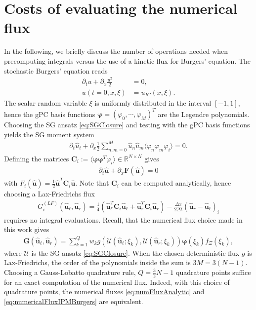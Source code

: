 \appendix
\section{Costs of evaluating the numerical flux}
\label{app:costNumFlux}
In the following, we briefly discuss the number of operations needed when precomputing integrals versus the use of a kinetic flux for Burgers' equation. The stochastic Burgers' equation reads
\begin{align*}
\partial_t u + \partial_x \frac{u^2}{2} &= 0,\\
u(t=0,x,\xi) &= u_{IC}(x,\xi).
\end{align*}
The scalar random variable $\xi$ is uniformly distributed in the interval $[-1,1]$, hence the gPC basis functions $\bm\varphi=(\varphi_0,\cdots,\varphi_M)^T$ are the Legendre polynomials. Choosing the SG ansatz \eqref{eq:SGClosure} and testing with the gPC basis functions yields the SG moment system
\begin{align*}
\partial_t \hat u_i + \partial_x \frac12\sum_{n,m = 0}^M \hat u_n \hat u_m \langle \varphi_n\varphi_m\varphi_i \rangle = 0.
\end{align*}
Defining the matrices $\bm C_i := \langle \bm\varphi\bm\varphi^T\varphi_i\rangle\in\mathbb{R}^{N\times N}$ gives
\begin{align*}
\partial_t \bm{\hat u} + \partial_x \bm F(\bm{\hat u}) = 0
\end{align*}
with $F_i(\bm{\hat u}) = \frac12\bm{\hat u}^T\bm C_i\bm{\hat u}$. Note that $\bm{C}_i$ can be computed analytically, hence choosing a Lax-Friedrichs flux
\begin{align}\label{eq:numFluxAnalytic}
G_i^{(LF)}(\bm{\hat u}_{\ell},\bm{\hat u}_{r}) =\frac{1}{4}\left(\bm{\hat u}_{\ell}^T \bm{C}_i \bm{\hat u}_{\ell}+\bm{\hat u}_{r}^T \bm{C}_i \bm{\hat u}_{r}\right) - \frac{\Delta x}{2\Delta t}(\bm{\hat u}_{r}-\bm{\hat u}_{\ell})_i
\end{align}
requires no integral evaluations. Recall, that the numerical flux choice made in this work gives
\begin{align}\label{eq:numericalFluxIPMBurgers}
 \bm{G}(\bm{\hat u}_{\ell},\bm{\hat u}_{r}) = \sum_{k=1}^Q w_k g(\mathcal{U}(\bm{\hat u}_{\ell};\xi_k),\mathcal{U}(\bm{\hat u}_{r};\xi_k))\bm{\varphi}(\xi_k)f_{\Xi}(\xi_k),
\end{align}
where $\mathcal{U}$ is the SG ansatz \eqref{eq:SGClosure}. When the chosen deterministic flux $g$ is Lax-Friedrichs, the order of the polynomials inside the sum is $3M=3(N-1)$. Choosing a Gauss-Lobatto quadrature rule, $Q = \frac32 N -1$ quadrature points suffice for an exact computation of the numerical flux. Indeed, with this choice of quadrature points, the numerical fluxes \eqref{eq:numFluxAnalytic} and \eqref{eq:numericalFluxIPMBurgers} are equivalent. 
